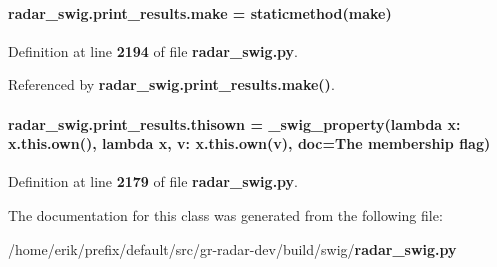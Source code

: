 \paragraph[{make}]{\setlength{\rightskip}{0pt plus 5cm}radar\+\_\+swig.\+print\+\_\+results.\+make = staticmethod(make)\hspace{0.3cm}{\ttfamily [static]}}\label{classradar__swig_1_1print__results_a3e37db54f9e278be49e49101e9fc7d5b}


Definition at line {\bf 2194} of file {\bf radar\+\_\+swig.\+py}.



Referenced by {\bf radar\+\_\+swig.\+print\+\_\+results.\+make()}.

\paragraph[{thisown}]{\setlength{\rightskip}{0pt plus 5cm}radar\+\_\+swig.\+print\+\_\+results.\+thisown = {\bf \+\_\+swig\+\_\+property}(lambda x\+: x.\+this.\+own(), lambda {\bf x}, v\+: x.\+this.\+own(v), doc=\textquotesingle{}The membership flag\textquotesingle{})\hspace{0.3cm}{\ttfamily [static]}}\label{classradar__swig_1_1print__results_a8c752112395ba37cec736fe526225a1c}


Definition at line {\bf 2179} of file {\bf radar\+\_\+swig.\+py}.



The documentation for this class was generated from the following file\+:\begin{DoxyCompactItemize}
\item 
/home/erik/prefix/default/src/gr-\/radar-\/dev/build/swig/{\bf radar\+\_\+swig.\+py}\end{DoxyCompactItemize}

